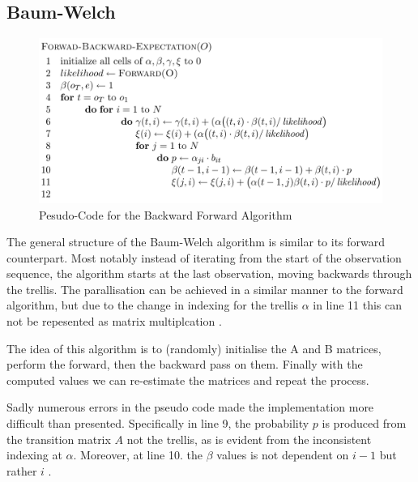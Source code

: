 \documentclass[english, paper=a4]{scrartcl}
\begin{document}
\subsection{Baum-Welch}


\begin{figure}[H]

\centering
\includegraphics[scale=0.4]{"BW"}
 \caption{Pesudo-Code for the Backward Forward Algorithm \cite{cuhmm}}

\end{figure}

The general structure of the Baum-Welch algorithm is similar to its forward counterpart. Most notably instead of iterating from the start of the observation sequence, the algorithm starts at the last observation, moving backwards through the trellis. The parallisation can be achieved in a similar manner to the forward algorithm, but due to the change in indexing for the trellis \(\alpha\) in line 11 this can not be repesented as matrix multiplcation \cite{cuhmm}.

The idea of this algorithm is to (randomly) initialise the A and B matrices, perform the forward, then the backward pass on them. Finally with the computed values we can re-estimate the matrices and repeat the process.

Sadly numerous errors in the pseudo code made the implementation more difficult than presented. Specifically in line 9, the probability \(p\) is produced from the transition matrix \(A\) not the trellis, as is evident from the inconsistent indexing at \(\alpha\). Moreover, at line 10. the \(\beta\) values is not dependent on \(i-1\) but rather \(i\) \cite{hmm}. 
\end{document}
